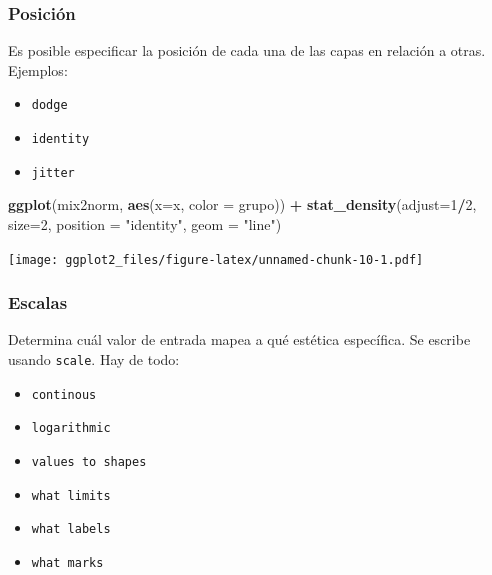 \documentclass[]{article}
\newenvironment{Shaded}{\begin{snugshade}}{\end{snugshade}}
\newcommand{\KeywordTok}[1]{\textcolor[rgb]{0.13,0.29,0.53}{\textbf{#1}}}
\newcommand{\DataTypeTok}[1]{\textcolor[rgb]{0.13,0.29,0.53}{#1}}
\newcommand{\DecValTok}[1]{\textcolor[rgb]{0.00,0.00,0.81}{#1}}
\newcommand{\StringTok}[1]{\textcolor[rgb]{0.31,0.60,0.02}{#1}}
\newcommand{\OperatorTok}[1]{\textcolor[rgb]{0.81,0.36,0.00}{\textbf{#1}}}
\newcommand{\NormalTok}[1]{#1}
\providecommand{\tightlist}{%
  \setlength{\itemsep}{0pt}\setlength{\parskip}{0pt}}
\begin{document}
\subsubsection{Posición}\label{posicion}

Es posible especificar la posición de cada una de las capas en relación
a otras. Ejemplos:

\begin{itemize}
\tightlist
\item
  \texttt{dodge}
\item
  \texttt{identity}
\item
  \texttt{jitter}
\end{itemize}

\begin{Shaded}
\begin{Highlighting}[]
\KeywordTok{ggplot}\NormalTok{(mix2norm, }\KeywordTok{aes}\NormalTok{(}\DataTypeTok{x=}\NormalTok{x, }\DataTypeTok{color =}\NormalTok{ grupo)) }\OperatorTok{+}\StringTok{ }
\StringTok{  }\KeywordTok{stat_density}\NormalTok{(}\DataTypeTok{adjust=}\DecValTok{1}\OperatorTok{/}\DecValTok{2}\NormalTok{, }\DataTypeTok{size=}\DecValTok{2}\NormalTok{, }\DataTypeTok{position =} \StringTok{"identity"}\NormalTok{, }\DataTypeTok{geom =} \StringTok{"line"}\NormalTok{)}
\end{Highlighting}
\end{Shaded}

\texttt{[image: ggplot2\_files/figure-latex/unnamed-chunk-10-1.pdf]}

\subsubsection{Escalas}\label{escalas}

Determina cuál valor de entrada mapea a qué estética específica. Se
escribe usando \texttt{scale}. Hay de todo:

\begin{itemize}
\tightlist
\item
  \texttt{continous}
\item
  \texttt{logarithmic}
\item
  \texttt{values\ to\ shapes}
\item
  \texttt{what\ limits}
\item
  \texttt{what\ labels}
\item
  \texttt{what\ marks}
\end{itemize}
\end{document}
